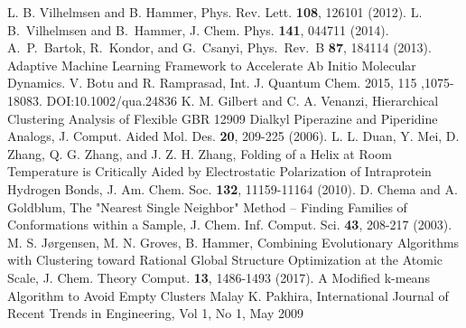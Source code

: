\documentclass[aip,amsmath,amssymb,reprint]{revtex4-1}
\begin{document}
\begin{thebibliography}{12}
L. B. Vilhelmsen and B. Hammer, Phys. Rev. Lett. \textbf{108}, 126101 (2012).
L. B.\ Vilhelmsen and B.\ Hammer, J. Chem. Phys. \textbf{141}, 044711 (2014).
 A.\ P.\ Bartok, R.\ Kondor, and G.\ Csanyi, Phys.\ Rev.\ B \textbf{87}, 184114 (2013).
 {Adaptive Machine Learning Framework to Accelerate Ab Initio Molecular Dynamics.} V. Botu and R. Ramprasad, Int. J. Quantum Chem. 2015, 115 ,1075-18083. DOI:10.1002/qua.24836    
 K. M. Gilbert and C. A. Venanzi, {Hierarchical Clustering Analysis of Flexible GBR 12909 Dialkyl Piperazine and Piperidine Analogs}, J. Comput. Aided Mol. Des. \textbf{20}, 209-225 (2006).  
 L. L. Duan, Y. Mei, D. Zhang, Q. G. Zhang, and J. Z. H. Zhang, {Folding of a Helix at Room Temperature is Critically Aided by Electrostatic Polarization of Intraprotein Hydrogen Bonds}, J. Am. Chem. Soc. \textbf{132}, 11159-11164 (2010).
 D. Chema and A. Goldblum, {The "Nearest Single Neighbor" Method -- Finding Families of Conformations within a Sample}, J. Chem. Inf. Comput. Sci. \textbf{43}, 208-217 (2003). 
 M. S. J{\o}rgensen, M. N. Groves, B. Hammer, {Combining Evolutionary Algorithms with Clustering toward Rational Global Structure Optimization at the Atomic Scale}, J. Chem. Theory Comput. \textbf{13}, 1486-1493 (2017). 
 {A Modified k-means Algorithm to Avoid Empty Clusters} Malay K. Pakhira, International Journal of Recent Trends in Engineering, Vol 1, No 1, May 2009
\end{thebibliography}
\end{document}
